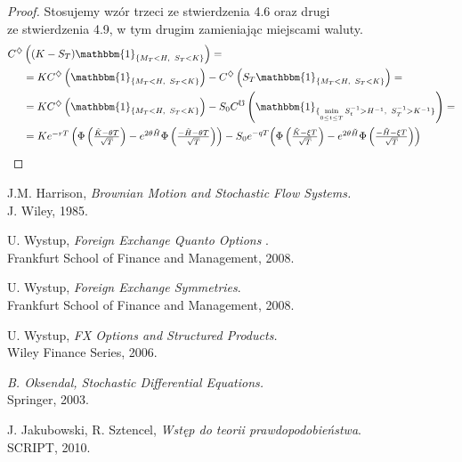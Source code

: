 \documentclass[11pt]{report}
\newcommand*{\Scale}[2][4]{\scalebox{#1}{$#2$}}%
\begin{document}
\begin{proof} Stosujemy wzór trzeci ze stwierdzenia 4.6 oraz drugi \\ ze stwierdzenia 4.9,  w tym drugim zamieniając miejscami waluty. $ $ \\
\begin{multline*}
\begin{split}
C^{\diamondsuit} & \left( (K - S_T)\mathbbm{1}_{ \{M_T < H, \hspace{0.15 cm} S_T < K \} } \right) = \\ & =  KC^{\diamondsuit} \left( \mathbbm{1}_{ \{M_T < H, \hspace{0.15 cm} S_T < K \}} \right) - C^{\diamondsuit}\left( S_T  \mathbbm{1}_{ \{M_T < H, \hspace{0.15 cm} S_T < K \}} \right) = \\ & = KC^{\diamondsuit} \left( \mathbbm{1}_{ \{M_T < H, \hspace{0.15 cm} S_T < K \}} \right) - S_0 C^{\mho}\left(\mathbbm{1}_{ \{ \min\limits_{0 \le t \le T} S_t^{-1} > H^{-1}, \hspace{0.15 cm} S^{-1}_T > K^{-1} \}} \right) = \\ & =  \Scale[1.0]{Ke^{-rT}\left(\Phi \left(\frac{ \tilde{K}-\theta T }{\sqrt{T}}\right) - e^{2 \theta \tilde{H}}\Phi\left(\frac{ -\tilde{H}-\theta T }{\sqrt{T}}\right)  \right)} - S_0 e^{-qT} \Scale[1.0]{\left(\Phi\left(\frac{ \tilde{K} - \xi T }{\sqrt{T}}\right) - e^{2 \theta \tilde{H}}\Phi\left(\frac{ -\tilde{H}-\xi T }{\sqrt{T}}\right) \right)}
\end{split}
\end{multline*}
\end{proof}





\begin{thebibliography}{2}
J.M. Harrison, 
\textit{Brownian Motion and Stochastic Flow Systems.} \\
J. Wiley, 1985.

U. Wystup,
\textit{Foreign Exchange Quanto Options }. \\
Frankfurt School of Finance and Management, 2008.

U. Wystup,
\textit{Foreign Exchange Symmetries}. \\
Frankfurt School of Finance and Management, 2008. 

U. Wystup,
\textit{FX Options and Structured Products. } \\
Wiley Finance Series, 2006.

\textit{B. Oksendal, Stochastic Differential Equations.} \\
Springer, 2003.

J. Jakubowski, R. Sztencel,
\textit{Wstęp do teorii prawdopodobieństwa}. \\
SCRIPT, 2010.

\end{thebibliography}
\end{document}
